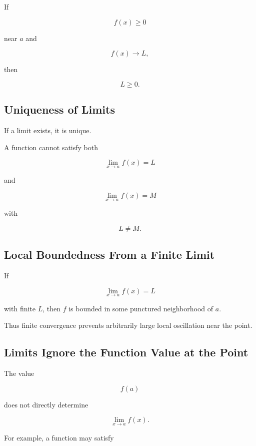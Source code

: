 If

\[
f(x)\geq0
\]

near \(a\) and

\[
f(x)\to L,
\]

then

\[
\boxed{
L\geq0.
}
\]

\subsection{Uniqueness of Limits}
\label{subsec:uniqueness-of-limits}

If a limit exists, it is unique.

A function cannot satisfy both

\[
\lim_{x\to a}f(x)=L
\]

and

\[
\lim_{x\to a}f(x)=M
\]

with

\[
L\neq M.
\]

\subsection{Local Boundedness From a Finite Limit}
\label{subsec:finite-limit-local-boundedness}

If

\[
\lim_{x\to a}f(x)=L
\]

with finite \(L\), then \(f\) is bounded in some punctured neighborhood of
\(a\).

Thus finite convergence prevents arbitrarily large local oscillation near
the point.

\subsection{Limits Ignore the Function Value at the Point}
\label{subsec:limit-independent-point-value}

The value

\[
f(a)
\]

does not directly determine

\[
\lim_{x\to a}f(x).
\]

For example, a function may satisfy

